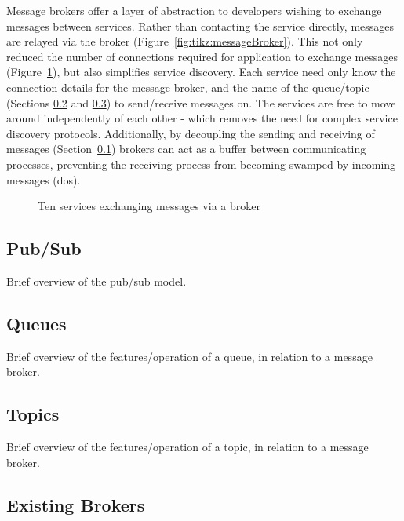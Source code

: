 Message brokers offer a layer of abstraction to developers wishing to exchange
messages between services. Rather than contacting the service directly, messages
are relayed via the broker (Figure~\ref{fig:tikz:messageBroker}). This not only
reduced the number of connections required for application to exchange messages
(Figure~\ref{fig:tikz:complexBrokerMessaging}), but also simplifies service
discovery. Each service need only know the connection details for the message
broker, and the name of the queue/topic (Sections \ref{sub:Queues} and
\ref{sub:Topics}) to send/receive messages on. The services are free to move
around independently of each other - which removes the need for complex service
discovery protocols. Additionally, by decoupling the sending and receiving of
messages (Section~\ref{sub:pubsub}) brokers can act as a buffer between
communicating processes, preventing the receiving process from becoming swamped
by incoming messages (\gls{dos}).

\begin{figure}[ht]
  \centering
  
  \caption{Ten services exchanging messages via a broker}
  \label{fig:tikz:complexBrokerMessaging}
\end{figure}

\subsection{Pub/Sub}
\label{sub:pubsub}

Brief overview of the pub/sub model.

\subsection{Queues}
\label{sub:Queues}

Brief overview of the features/operation of a queue, in relation to a message broker.


\subsection{Topics}
\label{sub:Topics}

Brief overview of the features/operation of a topic, in relation to a message broker.

\subsection{Existing Brokers}
\label{sub:Existing Brokers}

